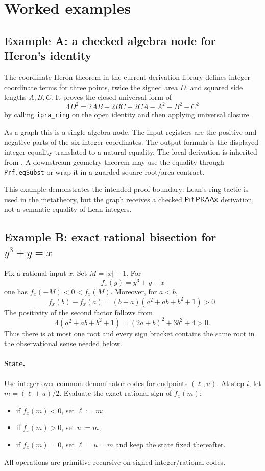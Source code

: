 \section{Worked examples}\label{sec:examples}

\subsection{Example A: a checked algebra node for Heron's identity}

The coordinate Heron theorem in the current derivation library defines integer-coordinate terms for three points, twice the signed area \(D\), and squared side lengths \(A,B,C\).  It proves the closed universal form of
\[
 4D^2=2AB+2BC+2CA-A^2-B^2-C^2
\]
by calling \texttt{ipra\_ring} on the open identity and then applying universal closure.

As a \KIFC graph this is a single algebra node.  The input registers are the positive and negative parts of the six integer coordinates.  The output formula is the displayed integer equality translated to a natural equality.  The local derivation is inherited from .  A downstream geometry theorem may use the equality through \texttt{Prf.eqSubst} or wrap it in a guarded square-root/area contract.

This example demonstrates the intended proof boundary: Lean's ring tactic is used in the metatheory, but the graph receives a checked \(\mathsf{Prf}\,\mathsf{PRAAx}\) derivation, not a semantic equality of Lean integers.

\subsection{\texorpdfstring{Example B: exact rational bisection for \(y^3+y=x\)}{Example B: exact rational bisection for y cubed plus y equals x}}

Fix a rational input \(x\).  Set \(M=|x|+1\).  For
\[
 f_x(y)=y^3+y-x
\]
one has \(f_x(-M)<0<f_x(M)\).  Moreover, for \(a<b\),
\[
 f_x(b)-f_x(a)
 =(b-a)(a^2+ab+b^2+1)>0.
\]
The positivity of the second factor follows from
\[
 4(a^2+ab+b^2+1)=(2a+b)^2+3b^2+4>0.
\]
Thus there is at most one root and every sign bracket contains the same root in the observational sense needed below.

\paragraph{State.}
Use integer-over-common-denominator codes for endpoints \((\ell,u)\).  At step \(i\), let \(m=(\ell+u)/2\).  Evaluate the exact rational sign of \(f_x(m)\):
\begin{itemize}
  \item if \(f_x(m)<0\), set \(\ell:=m\);
  \item if \(f_x(m)>0\), set \(u:=m\);
  \item if \(f_x(m)=0\), set \(\ell=u=m\) and keep the state fixed thereafter.
\end{itemize}
All operations are primitive recursive on signed integer/rational codes.

